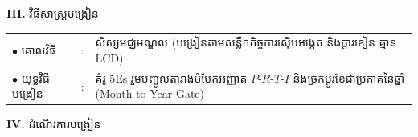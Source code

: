 \documentclass[a4paper,10pt]{article}
\newcommand{\en}[1]{{\TimesEn #1}}
\begin{document}
{\vspace{2pt}

\textbf{III.} {\muol វិធីសាស្រ្តបង្រៀន}\\[1pt]
\hspace*{0.45cm}%
\begin{tabular}{@{}l l L{14.85cm}@{}}
  $\bullet$ \hspace{0.25cm} គោលវិធី & : & សិស្សមជ្ឈមណ្ឌល (បង្រៀនតាមសន្លឹកកិច្ចការស៊ើបអង្កេត និងក្ដារខៀន គ្មាន \en{LCD}) \\
  $\bullet$ \hspace{0.25cm} យុទ្ធវិធីបង្រៀន & : & គំរូ \en{5Es} រួមបញ្ចូលតារាងបំបែកអញ្ញាត $P\text{-}R\text{-}T\text{-}I$ និងច្រកប្ដូរខែជាប្រភាគនៃឆ្នាំ (\en{Month-to-Year Gate}) \\
\end{tabular}
}

\vspace{2pt}

\textbf{IV.} {\muol ដំណើរការបង្រៀន}

\vspace{1pt}
\end{document}
